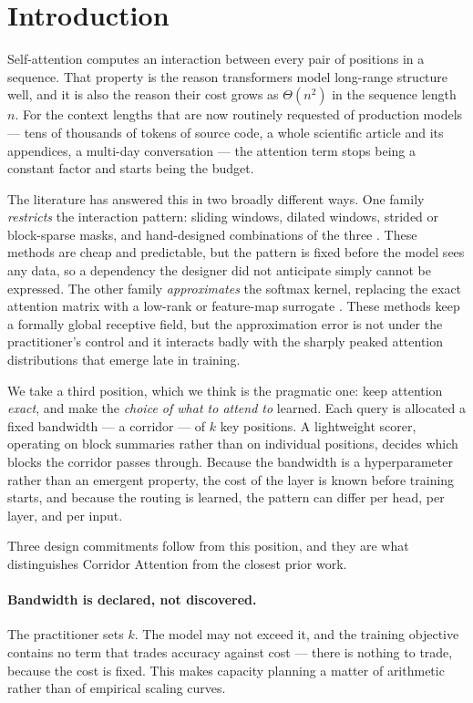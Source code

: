 \section{Introduction}\label{sec:intro}

Self-attention \citep{vaswani2017attention} computes an interaction between
every pair of positions in a sequence. That property is the reason
transformers model long-range structure well, and it is also the reason their
cost grows as $\Theta(n^2)$ in the sequence length $n$. For the context
lengths that are now routinely requested of production models --- tens of
thousands of tokens of source code, a whole scientific article and its
appendices, a multi-day conversation --- the attention term stops being a
constant factor and starts being the budget.

The literature has answered this in two broadly different ways. One family
\emph{restricts} the interaction pattern: sliding windows, dilated windows,
strided or block-sparse masks, and hand-designed combinations of the three
\citep{child2019sparse,beltagy2020longformer,zaheer2020bigbird}. These methods
are cheap and predictable, but the pattern is fixed before the model sees any
data, so a dependency the designer did not anticipate simply cannot be
expressed. The other family \emph{approximates} the softmax kernel, replacing
the exact attention matrix with a low-rank or feature-map surrogate
\citep{wang2020linformer,katharopoulos2020linear,choromanski2021performer}.
These methods keep a formally global receptive field, but the approximation
error is not under the practitioner's control and it interacts badly with the
sharply peaked attention distributions that emerge late in training.

We take a third position, which we think is the pragmatic one: keep attention
\emph{exact}, and make the \emph{choice of what to attend to} learned. Each
query is allocated a fixed bandwidth --- a corridor --- of $k$ key positions.
A lightweight scorer, operating on block summaries rather than on individual
positions, decides which blocks the corridor passes through. Because the
bandwidth is a hyperparameter rather than an emergent property, the cost of the
layer is known before training starts, and because the routing is learned, the
pattern can differ per head, per layer, and per input.

Three design commitments follow from this position, and they are what
distinguishes Corridor Attention from the closest prior work.

\paragraph{Bandwidth is declared, not discovered.} The practitioner sets $k$.
The model may not exceed it, and the training objective contains no term that
trades accuracy against cost --- there is nothing to trade, because the cost is
fixed. This makes capacity planning a matter of arithmetic rather than of
empirical scaling curves.

